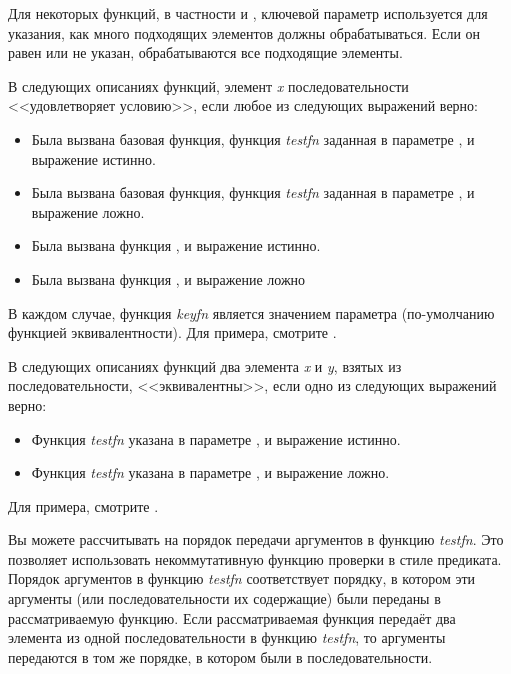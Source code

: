 Для некоторых функций, в частности  и , ключевой
параметр  используется для указания, как много подходящих элементов
должны обрабатываться. Если он равен {\false} или не указан, обрабатываются все
подходящие элементы.

В следующих описаниях функций, элемент \emph{x} последовательности
<<удовлетворяет условию>>, если любое из следующих выражений верно:
\begin{itemize}
\item
Была вызвана базовая функция, 
функция \emph{testfn} заданная в параметре , и 
выражение 
истинно.

\item
Была вызвана базовая функция, 
функция \emph{testfn}  заданная в параметре , и
выражение 
ложно.

\item
Была вызвана функция , и выражение
 истинно.

\item
Была вызвана функция , и выражение
 ложно
\end{itemize}
В каждом случае, функция \emph{keyfn} является значением параметра 
(по-умолчанию функцией эквивалентности). Для примера, смотрите .

В следующих описаниях функций
два элемента \emph{x} и \emph{y}, взятых из последовательности,
<<эквивалентны>>, если одно из следующих выражений верно:
\begin{itemize}
\item
Функция \emph{testfn} указана в параметре , и 
выражение
истинно.

\item
Функция \emph{testfn} указана в параметре , и 
выражение
ложно.
\end{itemize}
Для примера, смотрите .

Вы можете рассчитывать на порядок передачи аргументов в функцию \emph{testfn}.
Это позволяет использовать некоммутативную функцию проверки в стиле предиката.
Порядок аргументов в функцию \emph{testfn} соответствует порядку, в котором эти
аргументы (или последовательности их содержащие) были переданы в рассматриваемую
функцию.
Если рассматриваемая функция передаёт два элемента из одной последовательности в
функцию \emph{testfn}, то аргументы передаются в том же порядке, в котором были
в последовательности.

